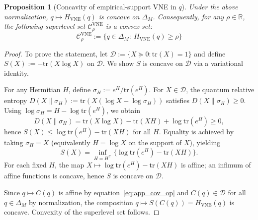 \documentclass[10pt,a4paper]{amsart}
\newtheorem{proposition}{Proposition}
\def\eqref#1{equation~\ref{#1}}
\begin{document}
\begin{proposition}[Concavity of empirical-support VNE in $q$]\label{prop:app_vne_concavity}
Under the above normalization, $q\mapsto H_{\mathrm{VNE}}(q)$ is concave on $\Delta_M$. Consequently, for any $\rho\in\mathbb{R}$, the following superlevel set $\mathcal{C}^{\mathrm{VNE}}_\rho$ is a convex set:
\[
\mathcal{C}^{\mathrm{VNE}}_\rho := \{q\in\Delta_M:\ H_{\mathrm{VNE}}(q)\ge \rho\}
\]
\end{proposition}

\begin{proof}
To prove the statement, let $\mathcal{D}:=\{X\succeq 0:\mathrm{tr}(X)=1\}$ and define $S(X):=-\mathrm{tr}(X\log X)$ on $\mathcal{D}$.
We show $S$ is concave on $\mathcal{D}$ via a variational identity.

For any Hermitian $H$, define $\sigma_H := e^{H}/\mathrm{tr}(e^{H})$. For $X\in\mathcal{D}$, the quantum relative entropy
$D(X\|\sigma_H):=\mathrm{tr}(X(\log X-\log\sigma_H))$ satisfies $D(X\|\sigma_H)\ge 0$.
Using $\log\sigma_H = H - \log\mathrm{tr}(e^{H})$, we obtain
\[
D(X\|\sigma_H)=\mathrm{tr}(X\log X)-\mathrm{tr}(XH)+\log\mathrm{tr}(e^{H})\ge 0,
\]
hence $S(X)\le \log\mathrm{tr}(e^{H})-\mathrm{tr}(XH)$ for all $H$. Equality is achieved by taking $\sigma_H=X$
(equivalently $H=\log X$ on the support of $X$), yielding
\[
S(X)=\inf_{H=H^\top}\bigl\{\log\mathrm{tr}(e^{H})-\mathrm{tr}(XH)\bigr\}.
\]
For each fixed $H$, the map $X\mapsto \log\mathrm{tr}(e^{H})-\mathrm{tr}(XH)$ is affine; an infimum of affine functions is concave, hence $S$ is concave on $\mathcal{D}$.

Since $q\mapsto C(q)$ is affine by \eqref{eq:app_cov_op} and $C(q)\in\mathcal{D}$ for all $q\in\Delta_M$ by normalization, the composition $q\mapsto S(C(q))=H_{\mathrm{VNE}}(q)$ is concave. Convexity of the superlevel set follows.
\end{proof}
\end{document}
